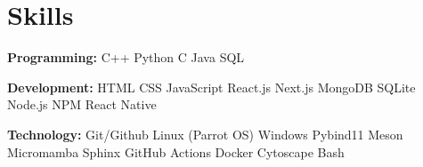 \documentclass[]{resume}
\begin{document}
\begin{minipage}[t]{0.60\textwidth}
\section{Skills}
\textbf{Programming: }
    C++ \textbullet{} Python \textbullet{} C \textbullet{} Java \textbullet{} SQL
\sectionsep

\textbf{Development: }
    HTML \textbullet{} CSS \textbullet{} JavaScript \textbullet{} React.js \textbullet{} Next.js \textbullet{} MongoDB \textbullet{} SQLite \textbullet{} Node.js \textbullet{} NPM \textbullet{} React Native
\sectionsep

\textbf{Technology: }
Git/Github \textbullet{} Linux (Parrot OS) \textbullet{} Windows \textbullet{} Pybind11 \textbullet{} Meson \textbullet{} Micromamba \textbullet{} Sphinx \textbullet{} GitHub Actions \textbullet{} Docker \textbullet{} Cytoscape \textbullet{} Bash 
\sectionsep

%
%

\end{minipage}
\hfill
\end{document}
